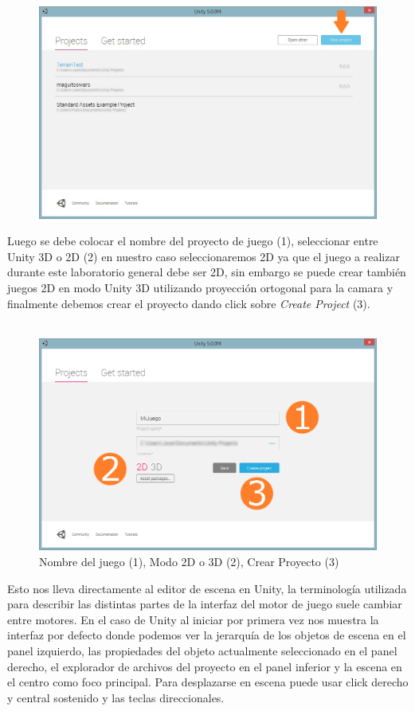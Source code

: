 \begin{figure}[H]
\centering
\includegraphics[width=0.80\linewidth]{media/1_ss1.jpg} 
\label{fig:unity_1}
\end{figure}

Luego se debe colocar el nombre del proyecto de juego (1), seleccionar entre Unity 3D o 2D (2) en nuestro caso seleccionaremos 2D ya que el juego a realizar durante este laboratorio general debe ser 2D, sin embargo se puede crear también juegos 2D en modo Unity 3D utilizando proyección ortogonal para la camara y finalmente debemos crear el proyecto dando click sobre \emph{Create Project} (3).\\~

\begin{figure}[H]
\centering
\includegraphics[width=0.80\linewidth]{media/1_ss2.jpg} 
\caption{Nombre del juego (1), Modo 2D o 3D (2), Crear Proyecto (3)}
\label{fig:unity_2}
\end{figure}

Esto nos lleva directamente al editor de escena en Unity, la terminología utilizada para describir las distintas partes de la interfaz del motor de juego suele cambiar entre motores. En el caso de Unity al iniciar por primera vez nos muestra la interfaz por defecto donde podemos ver la jerarquía de los objetos de escena en el panel izquierdo, las propiedades del objeto actualmente seleccionado en el panel derecho, el explorador de archivos del proyecto en el panel inferior y la escena en el centro como foco principal. Para desplazarse en escena puede usar click derecho y central sostenido y las teclas direccionales.\\~

